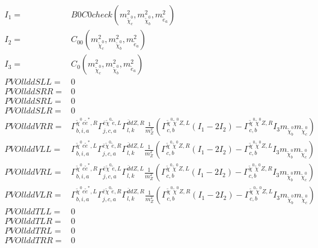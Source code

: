\documentclass[A4,landscape]{article}
\begin{document}
\begin{align} 
I_1= & B0C0check(m^2_{\tilde{\chi}^0_{{c}}}, m^2_{\tilde{\chi}^0_{{b}}}, m^2_{\tilde{e}_{{a}}}) \\ 
I_2= & C_{00}(m^2_{\tilde{\chi}^0_{{c}}}, m^2_{\tilde{\chi}^0_{{b}}}, m^2_{\tilde{e}_{{a}}}) \\ 
I_3= & C_0(m^2_{\tilde{\chi}^0_{{c}}}, m^2_{\tilde{\chi}^0_{{b}}}, m^2_{\tilde{e}_{{a}}}) \\ 
  PVOllddSLL= & 0 \\ 
  PVOllddSRR= & 0 \\ 
  PVOllddSRL= & 0 \\ 
  PVOllddSLR= & 0 \\ 
  PVOllddVRR= &  \Gamma^{\tilde{\chi}^0 e \tilde{e}^*,R}_{b, i, a} \Gamma^{\bar{e}\tilde{\chi}^0 \tilde{e} ,L}_{j, c, a} \Gamma^{\bar{d}d Z ,R}_{l, k} \frac{1}{m^2_{Z}} (\Gamma^{\tilde{\chi}^0 \tilde{\chi}^0 Z ,L}_{c, b} (I_1 - 2 I_2) - \Gamma^{\tilde{\chi}^0 \tilde{\chi}^0 Z ,R}_{c, b} I_3 m_{\tilde{\chi}^0_{{b}}} m_{\tilde{\chi}^0_{{c}}}) \\ 
  PVOllddVLL= &  \Gamma^{\tilde{\chi}^0 e \tilde{e}^*,L}_{b, i, a} \Gamma^{\bar{e}\tilde{\chi}^0 \tilde{e} ,R}_{j, c, a} \Gamma^{\bar{d}d Z ,L}_{l, k} \frac{1}{m^2_{Z}} (\Gamma^{\tilde{\chi}^0 \tilde{\chi}^0 Z ,R}_{c, b} (I_1 - 2 I_2) - \Gamma^{\tilde{\chi}^0 \tilde{\chi}^0 Z ,L}_{c, b} I_3 m_{\tilde{\chi}^0_{{b}}} m_{\tilde{\chi}^0_{{c}}}) \\ 
  PVOllddVRL= &  \Gamma^{\tilde{\chi}^0 e \tilde{e}^*,R}_{b, i, a} \Gamma^{\bar{e}\tilde{\chi}^0 \tilde{e} ,L}_{j, c, a} \Gamma^{\bar{d}d Z ,L}_{l, k} \frac{1}{m^2_{Z}} (\Gamma^{\tilde{\chi}^0 \tilde{\chi}^0 Z ,L}_{c, b} (I_1 - 2 I_2) - \Gamma^{\tilde{\chi}^0 \tilde{\chi}^0 Z ,R}_{c, b} I_3 m_{\tilde{\chi}^0_{{b}}} m_{\tilde{\chi}^0_{{c}}}) \\ 
  PVOllddVLR= &  \Gamma^{\tilde{\chi}^0 e \tilde{e}^*,L}_{b, i, a} \Gamma^{\bar{e}\tilde{\chi}^0 \tilde{e} ,R}_{j, c, a} \Gamma^{\bar{d}d Z ,R}_{l, k} \frac{1}{m^2_{Z}} (\Gamma^{\tilde{\chi}^0 \tilde{\chi}^0 Z ,R}_{c, b} (I_1 - 2 I_2) - \Gamma^{\tilde{\chi}^0 \tilde{\chi}^0 Z ,L}_{c, b} I_3 m_{\tilde{\chi}^0_{{b}}} m_{\tilde{\chi}^0_{{c}}}) \\ 
  PVOllddTLL= & 0 \\ 
  PVOllddTLR= & 0 \\ 
  PVOllddTRL= & 0 \\ 
  PVOllddTRR= & 0 \\ 
\end{align} 
\end{document}
